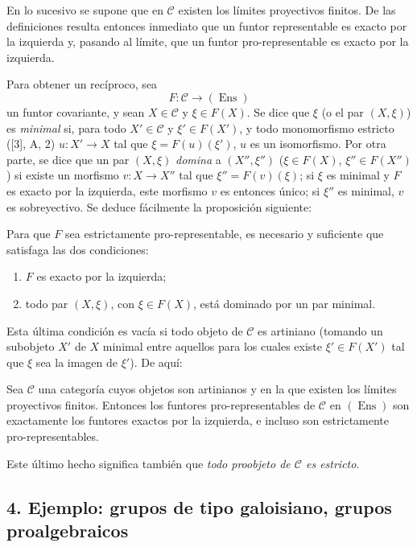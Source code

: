 En lo sucesivo se supone que en $\mathcal C$ existen los límites proyectivos
finitos. De las definiciones resulta entonces inmediato que un funtor
representable es exacto por la izquierda y, pasando al límite, que un funtor
pro-representable es exacto por la izquierda.

Para obtener un recíproco, sea
\[
  F:\mathcal C\longrightarrow(\operatorname{Ens})
\]
un funtor covariante, y sean $X\in\mathcal C$ y $\xi\in F(X)$. Se dice que
$\xi$ (o el par $(X,\xi)$) es \emph{minimal} si, para todo
$X'\in\mathcal C$ y $\xi'\in F(X')$, y todo monomorfismo estricto ([3], A, 2)
$u:X'\longrightarrow X$ tal que $\xi=F(u)(\xi')$, $u$ es un isomorfismo. Por
otra parte, se dice que un par $(X,\xi)$ \emph{domina} a $(X'',\xi'')$
($\xi\in F(X)$, $\xi''\in F(X'')$) si existe un morfismo
$v:X\longrightarrow X''$ tal que $\xi''=F(v)(\xi)$; si $\xi$ es minimal y $F$
es exacto por la izquierda, este morfismo $v$ es entonces único; si $\xi''$ es
minimal, $v$ es sobreyectivo. Se deduce fácilmente la proposición siguiente:

 Para que $F$ sea estrictamente pro-representable, es
necesario y suficiente que satisfaga las dos condiciones:
\begin{enumerate}
\item[(i)] $F$ es exacto por la izquierda;
\item[(ii)] todo par $(X,\xi)$, con $\xi\in F(X)$, está dominado por un par
minimal.
\end{enumerate}

Esta última condición es vacía si todo objeto de $\mathcal C$ es artiniano
(tomando un subobjeto $X'$ de $X$ minimal entre aquellos para los cuales existe
$\xi'\in F(X')$ tal que $\xi$ sea la imagen de $\xi'$). De aquí:

 Sea $\mathcal C$ una categoría cuyos objetos son
artinianos y en la que existen los límites proyectivos finitos. Entonces los
funtores pro-representables de $\mathcal C$ en $(\operatorname{Ens})$ son
exactamente los funtores exactos por la izquierda, e incluso son estrictamente
pro-representables.

Este último hecho significa también que \emph{todo proobjeto de $\mathcal C$
es estricto}.

\subsection*{4. Ejemplo: grupos de tipo galoisiano, grupos proalgebraicos}

